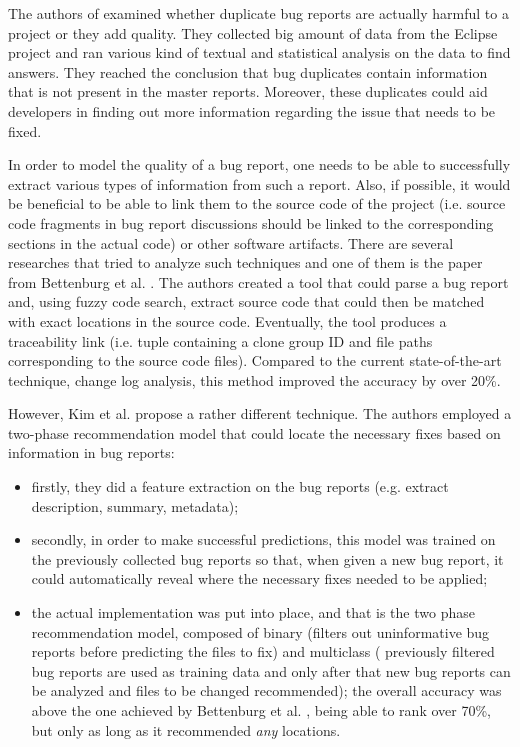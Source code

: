 \documentclass[11pt,english,twocolumn]{article}
\begin{document}
The authors of \cite{bettenburg2008duplicate} examined
whether duplicate bug reports are actually harmful to a project or they add 
quality. They collected big amount of data from the Eclipse project and ran
various kind of textual and statistical analysis on the data to find answers.
They reached the conclusion that bug duplicates contain information that is not
present in the master reports. Moreover, these duplicates could aid developers
in finding out more information regarding the issue that needs to be fixed.

In order to model the quality of a bug report, one needs to be able to
successfully extract various types of information from such a report. Also, if 
possible, it would be beneficial to be able to link them to the source code of the 
project (i.e. source code fragments in bug report discussions should be linked to 
the corresponding sections in the actual code) or other software artifacts. 
There are several researches that tried to analyze such techniques and one of them 
is the paper from Bettenburg et al. \cite{bettenburg2012using}. The authors created a 
tool that could parse a bug 
report and, using fuzzy code search, extract source code that could then be
matched with exact locations in the source code. Eventually, the tool produces a 
traceability link (i.e. tuple containing a clone group ID and file paths 
corresponding to the source code files). Compared to the current state-of-the-art
technique, change log analysis, this method improved the accuracy by over 20\%.

However, Kim et al. \cite{kim2013should} propose a rather different technique.
The authors employed a two-phase recommendation model that could locate the 
necessary fixes based on information in bug reports:
  \begin{itemize}
    \item firstly, they did a feature extraction on the bug reports (e.g. 
    extract description, summary, metadata);
    \item secondly, in order to make successful predictions, this model was trained 
    on the previously collected bug reports so that, when given a new bug report, 
    it could automatically reveal where the necessary fixes needed to be applied;
    \item the actual implementation was put into place, and that
    is the two phase recommendation model, composed of binary (filters out 
    uninformative bug reports before predicting the files to fix) and multiclass (
    previously filtered bug reports are used as training data and only after that
    new bug reports can be analyzed and files to be changed recommended); the 
    overall accuracy was above the one achieved by Bettenburg et al. \cite{bettenburg2012using}, 
    being able to rank over 70\%, but only as long as it recommended \emph{any} 
    locations.
  \end{itemize}
\end{document}
